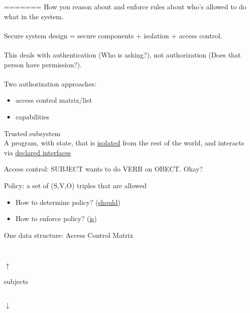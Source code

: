 =======
How you reason about and enforce rules about who's allowed to do what in the
system. 
\\
\\
Secure system design = secure components + isolation + access control.
\\
\\
This deals with authentication (Who is asking?), not authorization (Does that
person have permission?).
\\
\\
Two authorization approaches:
	\begin{itemize}
	\item access control matrix/list
	\item capabilities
	\end{itemize}

\begin{definition}{Trusted subsystem}\\
A program, with state, that is \underline{isolated} from
the rest of the world, and interacts via \underline{declared interfaces}
\end{definition}

Access control: SUBJECT wants to do VERB on OBECT. Okay?

Policy: a set of (S,V,O) triples that are allowed
\begin{itemize}
    \item How to determine policy? (\underline{should})
    \item How to enforce policy? (\underline{is})
\end{itemize}
One data structure: Access Control Matrix\\
\parbox[c]{5cm}{\\
\parbox[c]{1cm}{$\uparrow$\\
\begin{sideways}subjects\end{sideways}\\
$\downarrow$}
\makebox[.5cm]{}
}


